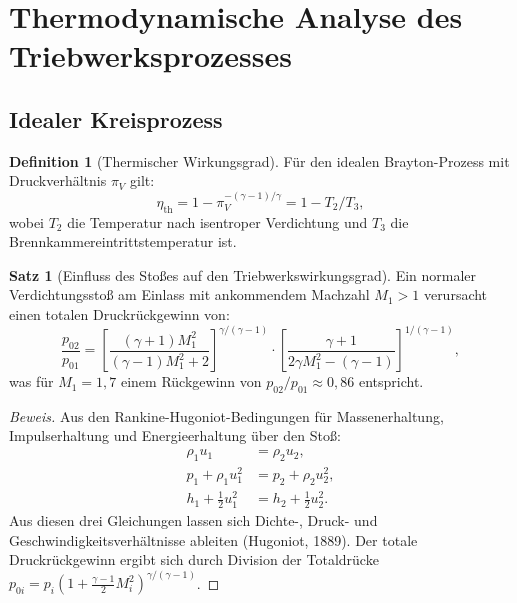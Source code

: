 ﻿\documentclass[12pt,a4paper]{article}
\theoremstyle{definition}
\newtheorem{definition}{Definition}[section]
\newtheorem{satz}{Satz}[section]
\theoremstyle{remark}
\newenvironment{beweis}{\begin{proof}[Beweis]}{\end{proof}}
\begin{document}
\section{Thermodynamische Analyse des Triebwerksprozesses}
\label{sec:thermodynamik}

\subsection{Idealer Kreisprozess}

\begin{definition}[Thermischer Wirkungsgrad]
  Für den idealen Brayton-Prozess mit Druckverhältnis $\pi_V$ gilt:
  \begin{equation}
    \eta_\text{th} = 1 - \pi_V^{-(\gamma-1)/\gamma} = 1 - T_2/T_3,
    \label{eq:brayton}
  \end{equation}
  wobei $T_2$ die Temperatur nach isentroper Verdichtung und $T_3$ die Brennkammereintrittstemperatur
  ist.
\end{definition}

\begin{satz}[Einfluss des Stoßes auf den Triebwerkswirkungsgrad]
  \label{satz:stossverlust}
  Ein normaler Verdichtungsstoß am Einlass mit ankommendem Machzahl $M_1 > 1$ verursacht
  einen totalen Druckrückgewinn von:
  \begin{equation}
    \frac{p_{02}}{p_{01}} = \left[\frac{(\gamma+1)M_1^2}{(\gamma-1)M_1^2 + 2}\right]^{\gamma/(\gamma-1)}
    \cdot \left[\frac{\gamma+1}{2\gamma M_1^2 - (\gamma-1)}\right]^{1/(\gamma-1)},
    \label{eq:druckrückgewinn}
  \end{equation}
  was für $M_1 = 1{,}7$ einem Rückgewinn von $p_{02}/p_{01} \approx 0{,}86$ entspricht.
\end{satz}

\begin{beweis}
  Aus den Rankine-Hugoniot-Bedingungen für Massenerhaltung, Impulserhaltung und
  Energieerhaltung über den Stoß:
  \begin{align}
    \rho_1 u_1 &= \rho_2 u_2, \\
    p_1 + \rho_1 u_1^2 &= p_2 + \rho_2 u_2^2, \\
    h_1 + \tfrac{1}{2}u_1^2 &= h_2 + \tfrac{1}{2}u_2^2.
  \end{align}
  Aus diesen drei Gleichungen lassen sich Dichte-, Druck- und Geschwindigkeitsverhältnisse
  ableiten (Hugoniot, 1889). Der totale Druckrückgewinn ergibt sich durch Division der
  Totaldrücke $p_{0i} = p_i(1 + \tfrac{\gamma-1}{2}M_i^2)^{\gamma/(\gamma-1)}$. \qedhere
\end{beweis}
\end{document}
